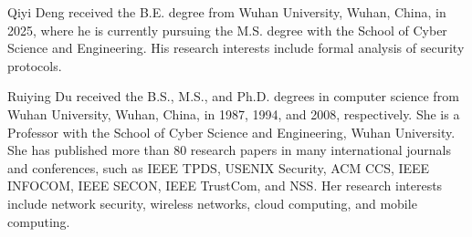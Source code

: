 \vspace{-20pt}
\begin{IEEEbiography}{Qiyi Deng}
received the B.E. degree from Wuhan University, Wuhan, China, in 2025, where he is currently pursuing the M.S. degree with the School of Cyber Science and Engineering.
His research interests include formal analysis of security protocols.
\end{IEEEbiography}

\vspace{-20pt}
\begin{IEEEbiography}{Ruiying Du}
received the B.S., M.S., and Ph.D. degrees in computer science from Wuhan University, Wuhan, China, in 1987, 1994, and 2008, respectively.
She is a Professor with the School of Cyber Science and Engineering, Wuhan University.
She has published more than 80 research papers in many international journals and conferences, such as IEEE TPDS, USENIX Security, ACM CCS, IEEE INFOCOM, IEEE SECON, IEEE TrustCom, and NSS.
Her research interests include network security, wireless networks, cloud computing, and mobile computing.
\end{IEEEbiography}
\vfill
